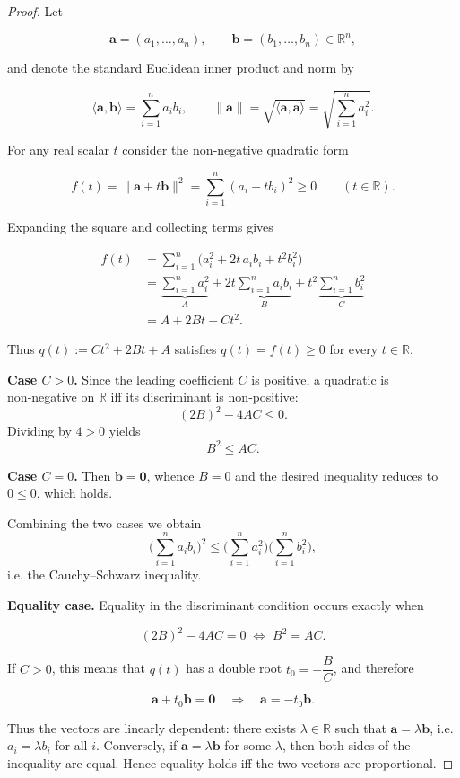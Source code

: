 \begin{proof}
Let  

\[
\mathbf a=(a_{1},\dots ,a_{n}), \qquad 
\mathbf b=(b_{1},\dots ,b_{n})\in\mathbb{R}^{n},
\]

and denote the standard Euclidean inner product and norm by  

\[
\langle\mathbf a,\mathbf b\rangle =\sum_{i=1}^{n}a_{i}b_{i},
\qquad 
\|\mathbf a\| =\sqrt{\langle\mathbf a,\mathbf a\rangle}
           =\sqrt{\sum_{i=1}^{n}a_{i}^{2}} .
\]

For any real scalar \(t\) consider the non‑negative quadratic form  

\[
f(t)=\|\mathbf a+t\mathbf b\|^{2}
     =\sum_{i=1}^{n}(a_{i}+t b_{i})^{2}\ge 0\qquad (t\in\mathbb R).
\]

Expanding the square and collecting terms gives  

\[
\begin{aligned}
f(t)
&=\sum_{i=1}^{n}\bigl(a_{i}^{2}+2t\,a_{i}b_{i}+t^{2}b_{i}^{2}\bigr)  \\
&=\underbrace{\sum_{i=1}^{n}a_{i}^{2}}_{A}
   +2t\underbrace{\sum_{i=1}^{n}a_{i}b_{i}}_{B}
   +t^{2}\underbrace{\sum_{i=1}^{n}b_{i}^{2}}_{C}  \\
&=A+2Bt+Ct^{2}.
\end{aligned}
\]

Thus \(q(t):=Ct^{2}+2Bt+A\) satisfies \(q(t)=f(t)\ge0\) for every \(t\in\mathbb R\).

\medskip
\noindent\textbf{Case \(C>0\).}  
Since the leading coefficient \(C\) is positive, a quadratic is non‑negative on \(\mathbb R\) iff its discriminant is non‑positive:
\[
(2B)^{2}-4AC\le 0.
\]
Dividing by \(4>0\) yields
\[
B^{2}\le AC.
\]

\noindent\textbf{Case \(C=0\).}  
Then \(\mathbf b=\mathbf0\), whence \(B=0\) and the desired inequality reduces to \(0\le0\), which holds.

Combining the two cases we obtain
\[
\biggl(\sum_{i=1}^{n}a_{i}b_{i}\biggr)^{2}
\le
\biggl(\sum_{i=1}^{n}a_{i}^{2}\biggr)
\biggl(\sum_{i=1}^{n}b_{i}^{2}\biggr),
\]
i.e. the Cauchy–Schwarz inequality.

\medskip
\textbf{Equality case.}  
Equality in the discriminant condition occurs exactly when  

\[
(2B)^{2}-4AC=0\;\Longleftrightarrow\;B^{2}=AC .
\]

If \(C>0\), this means that \(q(t)\) has a double root  
\(t_{0}=-\dfrac{B}{C}\), and therefore  

\[
\mathbf a+t_{0}\mathbf b=\mathbf0 \quad\Longrightarrow\quad
\mathbf a=-t_{0}\mathbf b .
\]

Thus the vectors are linearly dependent: there exists \(\lambda\in\mathbb R\) such that
\(\mathbf a=\lambda\mathbf b\), i.e. \(a_{i}=\lambda b_{i}\) for all \(i\).
Conversely, if \(\mathbf a=\lambda\mathbf b\) for some \(\lambda\), then both sides of the
inequality are equal. Hence equality holds iff the two vectors are proportional.

\end{proof}